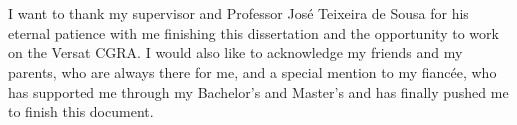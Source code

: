 
\section*{\acknowledgments}


I want to thank my supervisor and Professor José Teixeira de Sousa for his eternal patience with me finishing this dissertation
and the opportunity to work on the Versat CGRA.
I would also like to acknowledge my friends and my parents, who are always there for me, and a special mention 
to my fiancée, who has supported me through my Bachelor's and Master's and has finally pushed me to finish this document.

